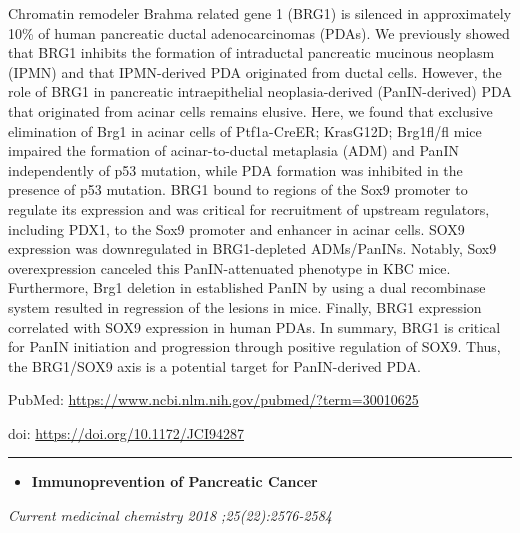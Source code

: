 \documentclass[]{article}
\providecommand{\tightlist}{%
  \setlength{\itemsep}{0pt}\setlength{\parskip}{0pt}}
\begin{document}
Chromatin remodeler Brahma related gene 1 (BRG1) is silenced in
approximately 10\% of human pancreatic ductal adenocarcinomas (PDAs). We
previously showed that BRG1 inhibits the formation of intraductal
pancreatic mucinous neoplasm (IPMN) and that IPMN-derived PDA originated
from ductal cells. However, the role of BRG1 in pancreatic
intraepithelial neoplasia-derived (PanIN-derived) PDA that originated
from acinar cells remains elusive. Here, we found that exclusive
elimination of Brg1 in acinar cells of Ptf1a-CreER; KrasG12D; Brg1fl/fl
mice impaired the formation of acinar-to-ductal metaplasia (ADM) and
PanIN independently of p53 mutation, while PDA formation was inhibited
in the presence of p53 mutation. BRG1 bound to regions of the Sox9
promoter to regulate its expression and was critical for recruitment of
upstream regulators, including PDX1, to the Sox9 promoter and enhancer
in acinar cells. SOX9 expression was downregulated in BRG1-depleted
ADMs/PanINs. Notably, Sox9 overexpression canceled this PanIN-attenuated
phenotype in KBC mice. Furthermore, Brg1 deletion in established PanIN
by using a dual recombinase system resulted in regression of the lesions
in mice. Finally, BRG1 expression correlated with SOX9 expression in
human PDAs. In summary, BRG1 is critical for PanIN initiation and
progression through positive regulation of SOX9. Thus, the BRG1/SOX9
axis is a potential target for PanIN-derived PDA.

PubMed: \url{https://www.ncbi.nlm.nih.gov/pubmed/?term=30010625}

doi: \url{https://doi.org/10.1172/JCI94287}

{}

{}

\begin{center}\rule{0.5\linewidth}{\linethickness}\end{center}

\begin{itemize}
\tightlist
\item
  \textbf{Immunoprevention of Pancreatic Cancer}
\end{itemize}

\emph{Current medicinal chemistry 2018 ;25(22):2576-2584}
\end{document}
